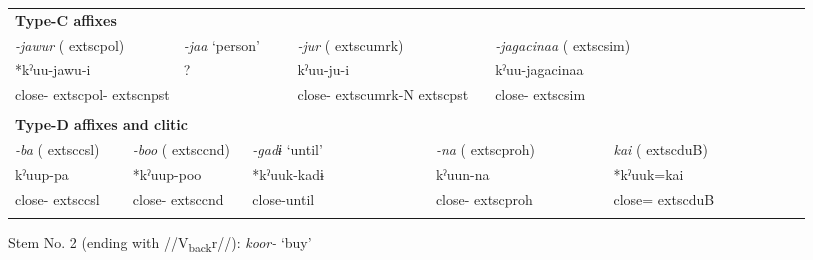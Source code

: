 \begin{tabularx}{\textwidth}{XXXXXXXXXXXXXXXXXXXXXXX}
\multicolumn{23}{X}{{\bfseries Type-C affixes}}\\
\multicolumn{4}{X}{{ \textit{{}-jawur} (	extsc{pol})}} & \multicolumn{2}{X}{{ \textit{{}-jaa} ‘person’}} & \multicolumn{4}{X}{{ \textit{{}-jur} (	extsc{umrk})}} & \multicolumn{4}{X}{{ \textit{{}-jagacinaa} (	extsc{sim})}} & \multicolumn{9}{X}{}\\
\multicolumn{4}{X}{{ *kˀuu-jawu-i}} & \multicolumn{2}{X}{{ ?}} & \multicolumn{4}{X}{kˀuu-ju-i} & \multicolumn{4}{X}{{ kˀuu-jagacinaa}} & \multicolumn{9}{X}{}\\
\multicolumn{4}{X}{close-	extsc{pol}-	extsc{npst}} & \multicolumn{2}{X}{} & \multicolumn{4}{X}{close-	extsc{umrk}-N	extsc{pst}} & \multicolumn{4}{X}{close-	extsc{sim}} & \multicolumn{9}{X}{}\\
\multicolumn{23}{X}{}\\
\multicolumn{23}{X}{{\bfseries Type-D affixes and clitic}}\\
\multicolumn{2}{X}{{ \textit{{}-ba} (	extsc{csl})}} & \multicolumn{3}{X}{{ \textit{{}-boo} (	extsc{cnd})}} & \multicolumn{4}{X}{{ \textit{{}-gadɨ} ‘until’}} & \multicolumn{4}{X}{{ \textit{{}-na} (	extsc{proh})}} & \multicolumn{4}{X}{{ \textit{kai} (	extsc{du}B)}} & \multicolumn{6}{X}{}\\
\multicolumn{2}{X}{{ kˀuup-pa}} & \multicolumn{3}{X}{{ *kˀuup-poo}} & \multicolumn{4}{X}{{ *kˀuuk-kadɨ}} & \multicolumn{4}{X}{{ kˀuun-na}} & \multicolumn{4}{X}{{ *kˀuuk=kai}} & \multicolumn{6}{X}{}\\
\multicolumn{2}{X}{close-	extsc{csl}} & \multicolumn{3}{X}{close-	extsc{cnd}} & \multicolumn{4}{X}{close-until} & \multicolumn{4}{X}{close-	extsc{proh}} & \multicolumn{4}{X}{close=	extsc{du}B} & \multicolumn{6}{X}{}\\
\lspbottomrule
\end{tabularx}
Stem No. 2 (ending with //V\textsubscript{back}r//): \textit{koor-} ‘buy’

\tablefirsthead{}

